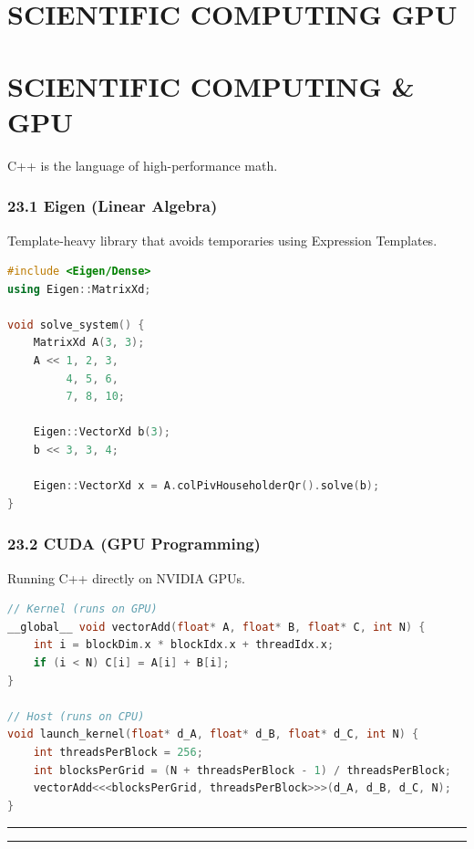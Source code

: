 \hypertarget{scientific-computing-gpu}{%
\chapter{SCIENTIFIC COMPUTING GPU}\label{scientific-computing-gpu}}

\hypertarget{scientific-computing-gpu-1}{%
\chapter{SCIENTIFIC COMPUTING \& GPU}\label{scientific-computing-gpu-1}}

C++ is the language of high-performance math.

\hypertarget{eigen-linear-algebra}{%
\subsection{23.1 Eigen (Linear Algebra)}\label{eigen-linear-algebra}}

Template-heavy library that avoids temporaries using Expression
Templates.

\begin{lstlisting}[language={C++}]
#include <Eigen/Dense>
using Eigen::MatrixXd;

void solve_system() {
    MatrixXd A(3, 3);
    A << 1, 2, 3,
         4, 5, 6,
         7, 8, 10;
    
    Eigen::VectorXd b(3);
    b << 3, 3, 4;
    
    Eigen::VectorXd x = A.colPivHouseholderQr().solve(b);
}
\end{lstlisting}

\hypertarget{cuda-gpu-programming}{%
\subsection{23.2 CUDA (GPU Programming)}\label{cuda-gpu-programming}}

Running C++ directly on NVIDIA GPUs.

\begin{lstlisting}[language={C++}]
// Kernel (runs on GPU)
__global__ void vectorAdd(float* A, float* B, float* C, int N) {
    int i = blockDim.x * blockIdx.x + threadIdx.x;
    if (i < N) C[i] = A[i] + B[i];
}

// Host (runs on CPU)
void launch_kernel(float* d_A, float* d_B, float* d_C, int N) {
    int threadsPerBlock = 256;
    int blocksPerGrid = (N + threadsPerBlock - 1) / threadsPerBlock;
    vectorAdd<<<blocksPerGrid, threadsPerBlock>>>(d_A, d_B, d_C, N);
}
\end{lstlisting}

\begin{center}\rule{0.5\linewidth}{0.5pt}\end{center}

\begin{center}\rule{0.5\linewidth}{0.5pt}\end{center}

